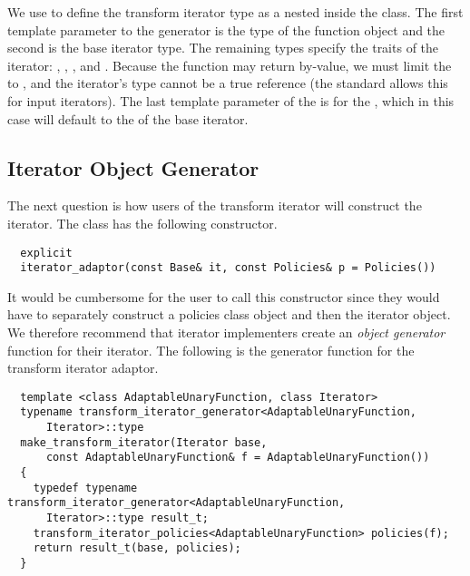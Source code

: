 \documentclass{netobjectdays}
\begin{document}
We use  to define the transform iterator type
as a nested  inside the
 class.  The first template
parameter to the generator is the type of the function object and the
second is the base iterator type. The remaining types specify the
traits of the iterator: , ,
, and .  Because the function
may return by-value, we must limit the  to
, and the iterator's
 type cannot be a true reference (the standard allows
this for input iterators). The last template parameter of the
 is for the , which
in this case will default to the  of the base
iterator.


\subsection{Iterator Object Generator}
\label{sec:iter-object-generator}

The next question is how users of the transform iterator will
construct the iterator. The  class has the
following constructor.

{\footnotesize
\begin{verbatim}
  explicit
  iterator_adaptor(const Base& it, const Policies& p = Policies())
\end{verbatim}
}

It would be cumbersome for the user to call this constructor since
they would have to separately construct a policies class object and
then the iterator object. We therefore recommend that iterator
implementers create an \emph{object generator} function for their
iterator. The following is the generator function for the transform
iterator adaptor.

{\footnotesize
\begin{verbatim}
  template <class AdaptableUnaryFunction, class Iterator>
  typename transform_iterator_generator<AdaptableUnaryFunction,
      Iterator>::type
  make_transform_iterator(Iterator base,
      const AdaptableUnaryFunction& f = AdaptableUnaryFunction())
  {
    typedef typename transform_iterator_generator<AdaptableUnaryFunction,
      Iterator>::type result_t;
    transform_iterator_policies<AdaptableUnaryFunction> policies(f);
    return result_t(base, policies);
  }
\end{verbatim}
}
\end{document}
